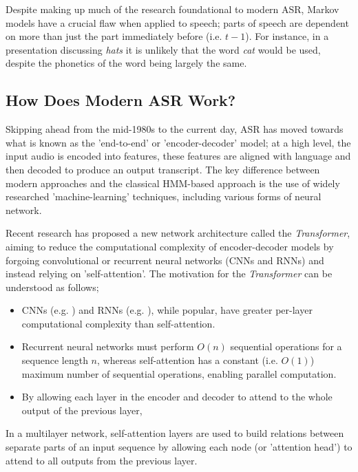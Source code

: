 Despite making up much of the research foundational to modern ASR, Markov models have a crucial flaw when applied to speech; parts of speech are dependent on more than just the part immediately before (i.e. $t-1$).
For instance, in a presentation discussing \emph{hats} it is unlikely that the word \emph{cat} would be used, despite the phonetics of the word being largely the same.

\subsection{How Does Modern ASR Work?}

Skipping ahead from the mid-1980s to the current day, ASR has moved towards what is known as the 'end-to-end' or 'encoder-decoder' model;
at a high level, the input audio is encoded into features, these features are aligned with language and then decoded to produce an output transcript\cite{wang2019overview}.
The key difference between modern approaches and the classical HMM-based approach is the use of widely researched 'machine-learning' techniques, including various forms of neural network\cite{mustafa2019comparative, amodei2016deep, hori2017advances, Kim2017Mar}.

Recent research has proposed a new network architecture called the \emph{Transformer}\cite{vaswani2017attention}, aiming to reduce the computational complexity of encoder-decoder models by forgoing convolutional or recurrent neural networks (CNNs and RNNs) and instead relying on 'self-attention'.
The motivation for the \emph{Transformer} can be understood as follows;

\begin{itemize}
        \item CNNs (e.g. \cite{zeghidour2018fully}) and RNNs (e.g. \cite{graves2014towards}), while popular, have greater per-layer computational complexity than self-attention\cite{vaswani2017attention}.
        \item Recurrent neural networks must perform $O(n)$ sequential operations for a sequence length $n$, whereas self-attention has a constant (i.e. $O(1)$) maximum number of sequential operations, enabling parallel computation\cite{vaswani2017attention}.
        \item By allowing each layer in the encoder and decoder to attend to the whole output of the previous layer, 
\end{itemize}

In a multilayer network, self-attention layers are used to build relations between separate parts of an input sequence by allowing each node (or 'attention head'\cite{shaw2018self}) to attend to all outputs from the previous layer.

